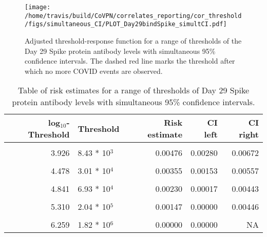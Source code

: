 \documentclass[]{book}
\theoremstyle{definition}
\theoremstyle{definition}
\theoremstyle{definition}
\newcommand{\1}{\mathbbm{1}}
\begin{document}
\begin{figure}[H]
\centering
\texttt{[image: /home/travis/build/CoVPN/correlates\_reporting/cor\_threshold/figs/simultaneous\_CI/PLOT\_Day29bindSpike\_simultCI.pdf]}
\caption{Adjusted threshold-response function for a range of thresholds of the
  Day 29 Spike protein antibody levels with simultaneous 95\% confidence intervals. The dashed red line marks the threshold after which no more COVID events are observed. }
\end{figure}
\begin{table}[!h]

\caption{\label{tab:unnamed-chunk-387}Table of risk estimates for a range of thresholds of Day 29 Spike protein antibody levels with simultaneous 95\% confidence intervals.}
\centering
\begin{tabular}[t]{rlrrr}
\toprule
log$_{10}$-Threshold & Threshold & Risk estimate & CI left & CI right\\
\midrule
\cellcolor{gray!6}{3.202} & \cellcolor{gray!6}{1.59 * 10$^3$} & \cellcolor{gray!6}{0.00567} & \cellcolor{gray!6}{0.00364} & \cellcolor{gray!6}{0.00770}\\
3.926 & 8.43 * 10$^3$ & 0.00476 & 0.00280 & 0.00672\\
\cellcolor{gray!6}{4.187} & \cellcolor{gray!6}{1.54 * 10$^4$} & \cellcolor{gray!6}{0.00460} & \cellcolor{gray!6}{0.00254} & \cellcolor{gray!6}{0.00666}\\
4.478 & 3.01 * 10$^4$ & 0.00355 & 0.00153 & 0.00557\\
\cellcolor{gray!6}{4.658} & \cellcolor{gray!6}{4.55 * 10$^4$} & \cellcolor{gray!6}{0.00278} & \cellcolor{gray!6}{0.00076} & \cellcolor{gray!6}{0.00481}\\
4.841 & 6.93 * 10$^4$ & 0.00230 & 0.00017 & 0.00443\\
\cellcolor{gray!6}{5.022} & \cellcolor{gray!6}{1.05 * 10$^5$} & \cellcolor{gray!6}{0.00182} & \cellcolor{gray!6}{0.00000} & \cellcolor{gray!6}{0.00400}\\
5.310 & 2.04 * 10$^5$ & 0.00147 & 0.00000 & 0.00446\\
\cellcolor{gray!6}{5.523} & \cellcolor{gray!6}{3.33 * 10$^5$} & \cellcolor{gray!6}{0.00132} & \cellcolor{gray!6}{0.00000} & \cellcolor{gray!6}{0.00511}\\
6.259 & 1.82 * 10$^6$ & 0.00000 & 0.00000 & NA\\
\bottomrule
\end{tabular}
\end{table}
\end{document}
